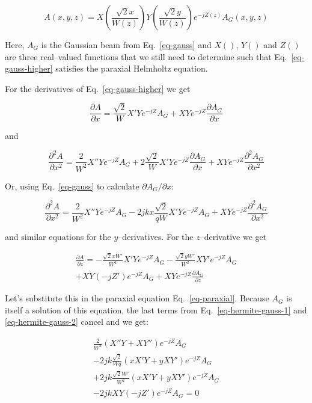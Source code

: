 \begin{equation}
A(x,y,z) = X\left({\frac{\sqrt{2}x}{W(z)}}\right) Y\left({\frac{\sqrt{2}y}{W(z)}}\right) e^{-jZ(z)} A_G(x,y,z) \label{eq-gauss-higher}
\end{equation} 

Here, $A_G$ is the Gaussian beam from Eq.~\ref{eq-gauss} and $X()$, $Y()$ and $Z()$ are three real--valued functions that we still need to determine such that Eq.~\ref{eq-gauss-higher} satisfies the paraxial Helmholtz equation.

For the derivatives of Eq.~\ref{eq-gauss-higher} we get

\begin{equation}
\frac{\partial A}{\partial x} = \frac{\sqrt{2}}{W}X'Ye^{-jZ} A_G + XYe^{-jZ} \frac{\partial A_G}{\partial x} 
\end{equation} 

and

\begin{equation}
\frac{\partial^2 A}{\partial x^2} = \frac{2}{W^2}X''Ye^{-jZ} A_G  + 2\frac{\sqrt{2}}{W}X'Ye^{-jZ} \frac{\partial A_G}{\partial x}  + XYe^{-jZ} \frac{\partial^2 A_G}{\partial x^2}
\end{equation} 

Or, using Eq.~\ref{eq-gauss} to calculate $\partial A_G / \partial x$:

\begin{equation}
\frac{\partial^2 A}{\partial x^2} = \frac{2}{W^2}X''Ye^{-jZ} A_G  - 2j k x \frac{\sqrt{2}}{qW}X'Ye^{-jZ}A_G  + XYe^{-jZ} \frac{\partial^2 A_G}{\partial x^2} \label{eq-hermite-gauss-1}
\end{equation} 

and similar equations for the $y$--derivatives. For the $z$--derivative we get

\begin{align}
\frac{\partial A}{\partial z} =  -\frac{\sqrt{2}x W'}{W^2}X'Ye^{-jZ} A_G -\frac{\sqrt{2}y W'}{W^2}XY'e^{-jZ} A_G \nonumber \\ 
+ XY\left(-jZ'\right)e^{-jZ} A_G + XYe^{-jZ}\frac{\partial A_G}{\partial z} \label{eq-hermite-gauss-2}
\end{align} 

Let's substitute this in the paraxial equation Eq.~\ref{eq-paraxial}. Because $A_G$ is itself a solution of this equation, the last terms from Eq.~\ref{eq-hermite-gauss-1} and \ref{eq-hermite-gauss-2} cancel and we get:

\begin{align}
\frac{2}{W^2}\left(X''Y+XY''\right)e^{-jZ} A_G   \nonumber \\
-2jk \frac{\sqrt{2}}{Wq}\left(xX'Y+yXY'\right)e^{-jZ}A_G \nonumber \\
+2jk \frac{\sqrt{2} W'}{W^2}\left(xX'Y+yXY'\right)e^{-jZ}A_G \nonumber \\
-2jk XY\left(-jZ'\right)e^{-jZ} A_G = 0
\end{align}


